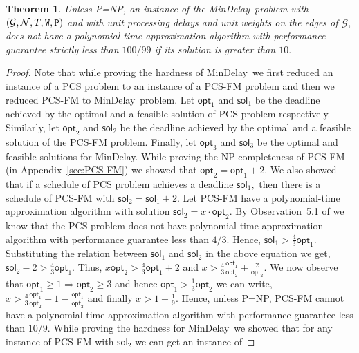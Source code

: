 \documentclass[journal]{IEEEtran}
\newtheorem{theorem}{{\bf Theorem}}
\newcommand{\net}{\mathcal{N}}
\newcommand{\compgraph}{\mathcal{G}}
\newcommand{\mindelay}{\textsf{MinDelay}}
\begin{document}
\begin{theorem}
  \label{thm:delayapprox}
  Unless P=NP, an instance of the \mindelay\ problem with
  $(\compgraph,\net,T,\edgewt,\processingwt)$ and with unit processing
  delays and unit weights on the edges of $\compgraph,$ does not have
  a polynomial-time approximation algorithm with performance guarantee
  strictly less than $100/99$ if its solution is greater than $10.$
\end{theorem}


\begin{proof}
  Note that while proving the hardness of \mindelay\ we first reduced
  an instance of a PCS problem to an instance of a PCS-FM problem and
  then we reduced PCS-FM to \mindelay\ problem. Let $\mathsf{opt}_1$
  and $\mathsf{sol}_1$ be the deadline achieved by the optimal and a
  feasible solution of PCS problem respectively. Similarly, let
  $\mathsf{opt}_2$ and $\mathsf{sol}_2$ be the deadline achieved by
  the optimal and a feasible solution of the PCS-FM problem. Finally,
  let $\mathsf{opt}_3$ and $\mathsf{sol}_3$ be the optimal and
  feasible solutions for \mindelay. While proving the NP-completeness
  of PCS-FM (in Appendix~\ref{sec:PCS-FM}) we showed that $\mathsf{opt}_2 =
  \mathsf{opt}_1 +2.$ We also showed that if a schedule of PCS problem
  achieves a deadline $\mathsf{sol}_1,$ then there is a schedule of
  PCS-FM with $\mathsf{sol}_2 = \mathsf{sol}_1 +2.$ Let PCS-FM have a
  polynomial-time approximation algorithm with solution
  $\mathsf{sol}_2 = x \cdot \mathsf{opt}_2.$ By Observation~5.1 of
  \cite{Hoogeveen98} we know that the PCS problem does not have
  polynomial-time approximation algorithm with performance guarantee
  less than $4/3.$ Hence, $\mathsf{sol}_1 > \frac{4}{3} \mathsf{opt}_1.$
  Substituting the relation between $\mathsf{sol}_1$ and
  $\mathsf{sol}_2$ in the above equation we get, 
  $\mathsf{sol}_2 -2 > \frac{4}{3} \mathsf{opt}_1.$ Thus, 
  $ x \mathsf{opt}_2 > \frac{4}{3} \mathsf{opt}_1 +2$ and $ x > \frac{4}{3}   \frac{\mathsf{opt}_1}{\mathsf{opt}_2} +\frac{2}{\mathsf{opt}_2}.$
  We now observe that $\mathsf{opt}_1 \geq 1 \Rightarrow
  \mathsf{opt}_2 \geq 3$ and hence $\mathsf{opt}_1 >
  \frac{1}{3}\mathsf{opt}_2$ we can write, $x > \frac{4}{3} \frac{\mathsf{opt}_1}{\mathsf{opt}_2} + 1 - \frac{\mathsf{opt}_1}{\mathsf{opt}_2}$ and finally $x > 1 + \frac{1}{9}.$
  Hence, unless P=NP, PCS-FM cannot have a polynomial time
  approximation algorithm with performance guarantee less than $10/9.$
  While proving the hardness for \mindelay\ we showed that for any
  instance of PCS-FM with $\mathsf{sol}_2$ we can get an instance of

\end{proof}
\end{document}

